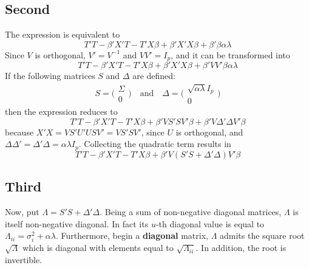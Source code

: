 \documentclass[a4paper]{article}
\begin{document}

\subsection*{Second} %
\label{sub:second}

The expression is equivalent to
\[T'T - \beta'X'T - T'X\beta + \beta'X'X\beta + \beta'\beta \alpha\lambda \]
Since $V$ is orthogonal, $V'=V^{-1}$ and $VV' = I_p$, and it can be transformed into
\[T'T - \beta'X'T - T'X\beta + \beta'X'X\beta + \beta'VV'\beta \alpha\lambda \]
If the following matrices $S$ and $\Delta$ are defined:
\[S = \bigg(\begin{matrix} \Sigma \\ 0 \end{matrix}\bigg)\quad\text{and}\quad \Delta = \bigg(\begin{matrix} \sqrt{\alpha \lambda}I_p \\ 0 \end{matrix}\bigg)\]
then the expression reduces to
\[T'T - \beta'X'T - T'X\beta + \beta'VS'SV'\beta + \beta'V \Delta' \Delta V'\beta \]
because $X'X = VS'U'USV' = VS'SV'$, since $U$ is orthogonal, and $\Delta\Delta' = \Delta'\Delta = \alpha\lambda I_p$.
Collecting the quadratic term results in
\[T'T - \beta'X'T - T'X\beta + \beta'V(S'S+\Delta'\Delta)V'\beta \]


\subsection*{Third} %
\label{sub:third}

Now, put $\Lambda = S'S+\Delta'\Delta$. Being a sum of non-negative diagonal matrices, $\Lambda$ is itself non-negative diagonal. In fact its $u$-th diagonal value is equal to $\Lambda_{ii} = \sigma_i^2 + \alpha \lambda$. Furthermore, begin a \textbf{diagonal} matrix, $\Lambda$ admits the square root $\sqrt{\Lambda}$ which is diagonal with elements equal to $\sqrt{\Lambda_{ii}}$. In addition, the root is invertible.
\end{document}
